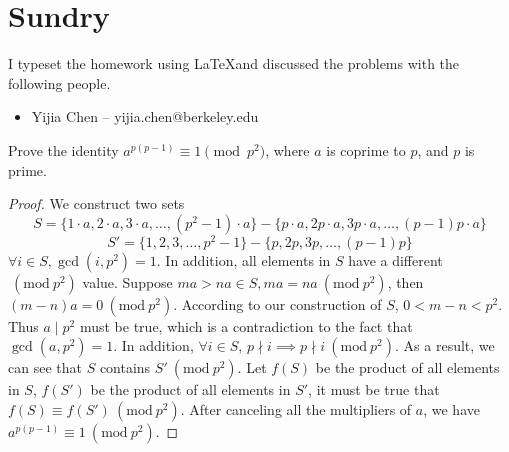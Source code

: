 \documentclass[11pt]{article}
\newcommand{\Mod}[1]{\ (\mathrm{mod}\ #1)}
\begin{document}
\section*{Sundry}

\begin{Answer}
    I typeset the homework using \LaTeX and discussed the problems with the following people. 
    \begin{itemize}
        \item Yijia Chen -- yijia.chen@berkeley.edu
    \end{itemize}
\end{Answer}

\newpage
{}

\begin{Parts}
    \Part Prove the identity $a^{p(p - 1)} \equiv 1 \pmod{p^2}$, where $a$ is coprime to $p$, and $p$ is prime.
    \begin{Answer}
        \begin{proof}
            We construct two sets $$S = \{1\cdot a,2 \cdot a,3\cdot a,\ldots,(p^2-1)\cdot a\} - \{p\cdot a,2p\cdot a,3p\cdot a,\ldots,(p-1)p\cdot a\}$$
            $$S' = \{1, 2, 3, \ldots, p^2 - 1\} - \{p, 2p, 3p, \ldots, (p-1)p\}$$ $\forall i \in S, \gcd(i, p^2)=1$. In addition, all elements in $S$ 
            have a different $\Mod{p^2}$ value. Suppose $ma > na \in S, ma = na \Mod{p^2}$, then $(m-n)a = 0 \Mod{p^2}$. According to our construction
            of $S$, $0 < m-n < p^2$. Thus $a \mid p^2$ must be true, which is a contradiction to the fact that $\gcd(a, p^2) = 1$. In addition, 
            $\forall i \in S$, $p \nmid i \implies p \nmid i \Mod{p^2}$. As a result, we can see that $S$ contains $S' \Mod{p^2}$. Let $f(S)$ be the 
            product of all elements in $S$, $f(S')$ be the product of all elements in $S'$, it must be true that $f(S) \equiv f(S') \Mod{p^2}$. 
            After canceling all the multipliers of $a$, we have $a^{p(p-1)} \equiv 1 \Mod{p^2}$. 
        \end{proof}

    \end{Answer}


\end{Parts}
\end{document}
